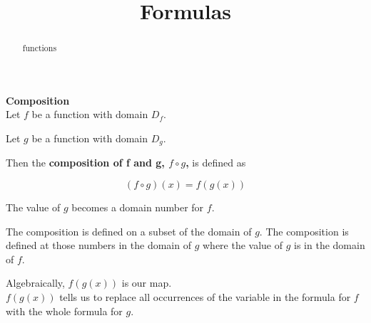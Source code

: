 \documentclass{ximera}
\title{Formulas}
\begin{document}
\begin{abstract}
functions
\end{abstract}
\maketitle









\begin{template} \textbf{\textcolor{blue!55!black}{Composition}}  \\


Let $f$ be a function with domain $D_f$.


Let $g$ be a function with domain $D_g$.




Then the \textbf{\textcolor{green!50!black}{composition of f and g, $f \circ g$,}} is defined as

\[
(f \circ g)(x) = f(g(x))
\] 


The value of $g$ becomes a domain number for $f$.


The composition is defined on a subset of the domain of $g$.  The composition is defined at those numbers in the domain of $g$ where the value of $g$ is in the domain of $f$.




\end{template}





Algebraically, $f(g(x))$ is our map. \\


$f(g(x))$ tells us to replace all occurrences of the variable in the formula for $f$ with the whole formula for $g$. \\
\end{document}
